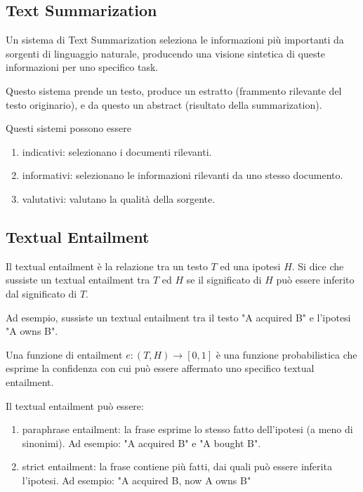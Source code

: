 \subsection{Text Summarization}
Un sistema di Text Summarization seleziona le informazioni più importanti da sorgenti di linguaggio naturale, producendo una visione sintetica di queste informazioni per uno specifico task.

Questo sistema prende un testo, produce un estratto (frammento rilevante del testo originario), e da questo un abstract (risultato della summarization).

Questi sistemi possono essere 

\begin{enumerate}
	
	\item indicativi: selezionano i documenti rilevanti.
	
	\item informativi: selezionano le informazioni rilevanti da uno stesso documento.
	
	\item valutativi: valutano la qualità della sorgente.
\end{enumerate}


\subsection{Textual Entailment}
Il textual entailment è la relazione tra un testo $T$ ed una ipotesi $H$. Si dice che sussiste un textual entailment tra $T$ ed $H$ se il significato di $H$ può essere inferito dal significato di $T$.

Ad esempio, sussiste un textual entailment tra il testo "A acquired B" e l'ipotesi "A owns B".

Una funzione di entailment $e:(T,H)\rightarrow [0,1]$ è una funzione probabilistica che esprime la confidenza con cui può essere affermato uno specifico textual entailment.

Il textual entailment può essere:

\begin{enumerate}

	\item paraphrase entailment: la frase esprime lo stesso fatto dell'ipotesi (a meno di sinonimi).
	Ad esempio: "A acquired B" e "A bought B".
	
	\item strict entailment: la frase contiene più fatti, dai quali può essere inferita l'ipotesi.
	Ad esempio: "A acquired B, now A owns B"
	
\end{enumerate}